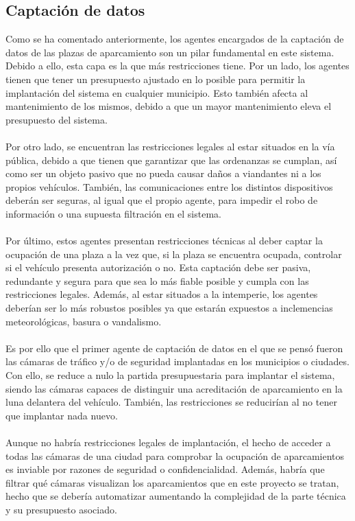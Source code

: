 \subsection{Captación de datos} \label{captacion}
Como se ha comentado anteriormente, los agentes encargados de la captación de datos de las plazas de aparcamiento son un pilar fundamental en este sistema. Debido a ello, esta capa es la que más restricciones tiene. Por un lado, los agentes tienen que tener un presupuesto ajustado en lo posible para permitir la implantación del sistema en cualquier municipio. Esto también afecta al mantenimiento de los mismos, debido a que un mayor mantenimiento eleva el presupuesto del sistema.
\\\\
Por otro lado, se encuentran las restricciones legales al estar situados en la vía pública, debido a que tienen que garantizar que las ordenanzas se cumplan, así como ser un objeto pasivo que no pueda causar daños a viandantes ni a los propios vehículos. También, las comunicaciones entre los distintos dispositivos deberán ser seguras, al igual que el propio agente, para impedir el robo de información o una supuesta filtración en el sistema.
\\\\
Por último, estos agentes presentan restricciones técnicas al deber captar la ocupación de una plaza a la vez que, si la plaza se encuentra ocupada, controlar si el vehículo presenta autorización o no. Esta captación debe ser pasiva, redundante y segura para que sea lo más fiable posible y cumpla con las restricciones legales. Además, al estar situados a la intemperie, los agentes deberían ser lo más robustos posibles ya que estarán expuestos a inclemencias meteorológicas, basura o vandalismo.
\\\\
Es por ello que el primer agente de captación de datos en el que se pensó fueron las cámaras de tráfico y/o de seguridad implantadas en los municipios o ciudades. Con ello, se reduce a nulo la partida presupuestaria para implantar el sistema, siendo las cámaras capaces de distinguir una acreditación de aparcamiento en la luna delantera del vehículo. También, las restricciones se reducirían al no tener que implantar nada nuevo.
\\\\
Aunque no habría restricciones legales de implantación, el hecho de acceder a todas las cámaras de una ciudad para comprobar la ocupación de aparcamientos es inviable por razones de seguridad o confidencialidad. Además, habría que filtrar qué cámaras visualizan los aparcamientos que en este proyecto se tratan, hecho que se debería automatizar aumentando la complejidad de la parte técnica y su presupuesto asociado.

